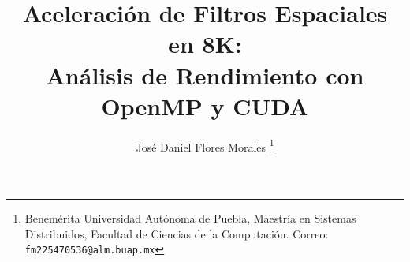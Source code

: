 \documentclass[twocolumn,twoside]{Jornadas}
\begin{document}
\title{Aceleración de Filtros Espaciales en 8K:\\ Análisis de Rendimiento con OpenMP y CUDA}

\author{%
     José Daniel Flores Morales%
     \thanks{Benemérita Universidad Autónoma de Puebla, Maestría en Sistemas Distribuidos, Facultad de Ciencias de la Computación. Correo: {\tt fm225470536@alm.buap.mx}}
}

\maketitle
\markboth{}{}
\pagestyle{empty} 
\thispagestyle{empty} 












\nocite{*}


\end{document}
